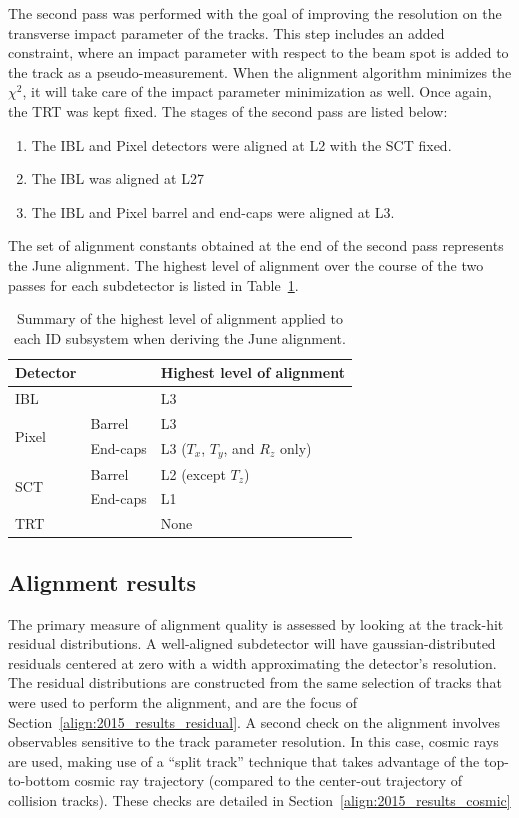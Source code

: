 The second pass was performed with the goal of improving the resolution on the transverse impact parameter of the tracks.
This step includes an added constraint, where an impact parameter with respect to the beam spot is added to the track as a pseudo-measurement.
When the alignment algorithm minimizes the $\chi^2$, it will take care of the impact parameter minimization as well.
Once again, the TRT was kept fixed.
The stages of the second pass are listed below:
\begin{enumerate}
\item The IBL and Pixel detectors were aligned at L2 with the SCT fixed.
\item The IBL was aligned at L27
\item The IBL and Pixel barrel and end-caps were aligned at L3.
\end{enumerate}
The set of alignment constants obtained at the end of the second pass represents the June alignment.
The highest level of alignment over the course of the two passes for each subdetector is listed in Table~\ref{tab:align_june_levels}.

\begin{table}[htbp]
  \centering
  \begin{tabular}{l l | l}
    Detector & & Highest level of alignment\\
    \hline\hline
    IBL && L3 \\
    \hline
    \multirow{2}{*}{Pixel} & Barrel & L3 \\
                           & End-caps & L3 ($T_x$, $T_y$, and $R_z$ only) \\
    \hline
    \multirow{2}{*}{SCT} & Barrel & L2 (except $T_z$) \\
                           & End-caps & L1 \\
    \hline
    TRT && None\\
    \hline
  \end{tabular}
  \caption{Summary of the highest level of alignment applied to each ID subsystem when deriving the June alignment.}
  \label{tab:align_june_levels}
\end{table}

\subsection{Alignment results}
The primary measure of alignment quality is assessed by looking at the track-hit residual distributions.
A well-aligned subdetector will have gaussian-distributed residuals centered at zero with a width approximating the detector's resolution.
The residual distributions are constructed from the same selection of tracks that were used to perform the alignment, and are the focus of Section~\ref{align:2015_results_residual}.
A second check on the alignment involves observables sensitive to the track parameter resolution.
In this case, cosmic rays are used, making use of a ``split track'' technique that takes advantage of the top-to-bottom cosmic ray trajectory (compared to the center-out trajectory of collision tracks).
These checks are detailed in Section~\ref{align:2015_results_cosmic}

